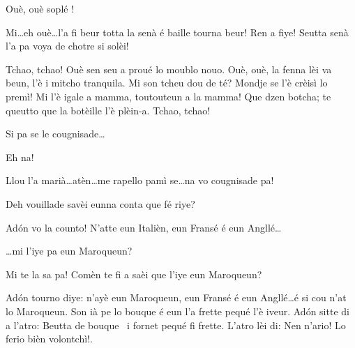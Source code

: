 \begin{drama}

\Valletspeaks Ouè, ouè soplé !


\Prosperospeaks Mi\ldots eh ouè\ldots l'a fi beur totta la senà é baille tourna beur! Ren a fiye! Seutta senà l'a pa voya de chotre si solèi!

\Prosperospeaks{} Tchao, tchao! Ouè sen seu a proué lo moublo nouo. Ouè, ouè, la fenna lèi va beun, l'è i mitcho tranquila. Mi son tcheu dou de té? Mondje se l'è crèisì lo premì! Mi l'è igale a mamma, toutouteun a la mamma! Que dzen botcha; te queutto que la botèille l'è plèin-a. Tchao, tchao!


\Prosperospeaks{} Si pa se le cougnisade\ldots

\Valletspeaks Eh na!

\Prosperospeaks Llou l'a marià\ldots atèn\ldots me rapello pamì se\ldots na  vo cougnisade pa!


\Prosperospeaks{} Deh vouillade savèi eunna conta que fé riye?


\Prosperospeaks Ad\'on vo la counto! N’atte eun Italièn, eun Fransé é eun Angllé\ldots 

\Vetchotspeaks \ldots mi l'iye pa eun Maroqueun?

\Prosperospeaks Mi te la sa pa! Comèn te fi a saèi que l'iye eun Maroqueun?


\Prosperospeaks{} Ad\'on tourno diye: n'ayè eun Maroqueun, eun Fransé é eun Angllé\ldots é si cou n'at lo Maroqueun. Son ià pe lo bouque é eun l'a frette pequé l'è iveur. Ad\'on sitte di a l'atro: \og Beutta de bouque \legna\ i fornet pequé fi frette\fg . L'atro lèi di: \og Nen n'ario! Lo ferio bièn volontchì!\fg .


\end{drama}

